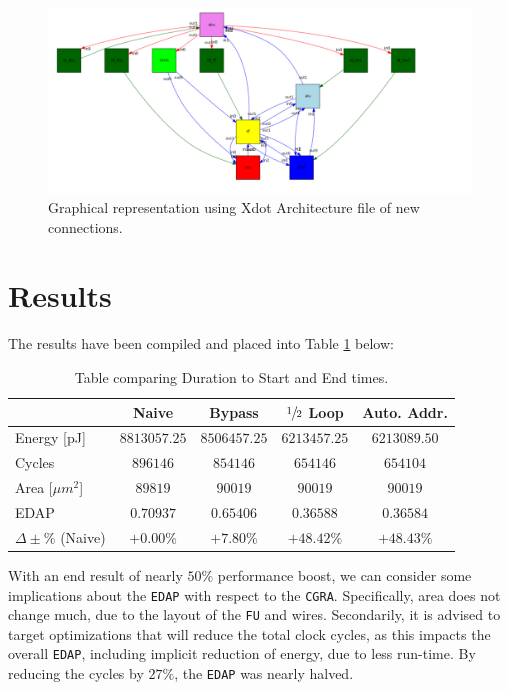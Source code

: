 \documentclass[letterpaper, 10 pt, conference]{ieeeconf}  %
\begin{document}
\begin{figure}[h!]
\begin{center}
\includegraphics[scale=0.28]{images/arch.png}
\caption{Graphical representation using Xdot Architecture file of new connections.}
\label{fig:TODO2}
\end{center}
\end{figure}

\pagebreak

\section{Results}

The results have been compiled and placed into Table \ref{tab:compare} below:

\begin{table}[h!]
\centering
\caption{Table comparing Duration to Start and End times.}
\label{tab:compare}
\vspace{5pt}
\centering
\begin{tabular}{|l|c|c|c|c|}
\rowcolor[HTML]{C0C0C0}
\hline
 & Naive & Bypass & $\sfrac{1}{2}$ Loop & Auto. Addr. \\ \hline
Energy [pJ] & $8813057.25$  & $8506457.25$ & $6213457.25$ & $6213089.50$ \\ \hline
Cycles & $896146$ & $854146$ & $654146$ & $654104$ \\ \hline
Area [$\mu m^2$] & $89819$ & $90019$ & $90019$ & $90019$ \\ \hline
EDAP & $0.70937$ & $0.65406$ & $0.36588$ & $0.36584$ \\ \hline
$\Delta\pm\%$ (Naive) & $+0.00\%$ & $+7.80\%$ & $+48.42\%$ & $+48.43\%$ \\ \hline

\end{tabular}
\end{table}

With an end result of nearly $50\%$ performance boost, we can consider some implications about the \texttt{EDAP} with respect to the \texttt{CGRA}. Specifically, area does not change much, due to the layout of the \texttt{FU} and wires. Secondarily, it is advised to target optimizations that will reduce the total clock cycles, as this impacts the overall \texttt{EDAP}, including implicit reduction of energy, due to less run-time. By reducing the cycles by $27\%$, the \texttt{EDAP} was nearly halved.
\end{document}
